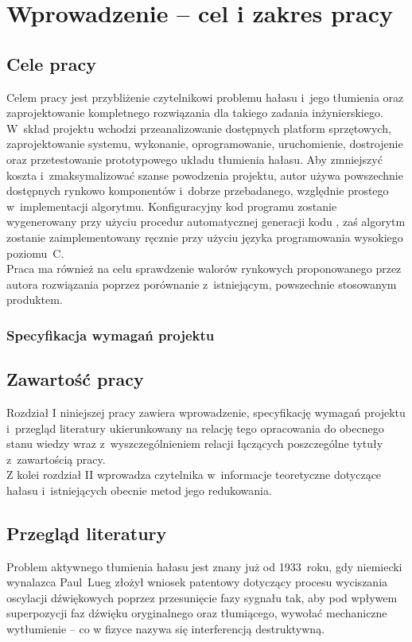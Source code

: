 \chapter{Wprowadzenie -- cel i zakres pracy}
\label{cha:intro}

\section{Cele pracy}
\label{sec:celePracy}
Celem pracy jest przybliżenie czytelnikowi problemu hałasu i~jego tłumienia oraz  zaprojektowanie kompletnego rozwiązania dla takiego zadania inżynierskiego. W~skład projektu wchodzi przeanalizowanie dostępnych platform sprzętowych, zaprojektowanie systemu, wykonanie, oprogramowanie, uruchomienie, dostrojenie oraz przetestowanie prototypowego układu tłumienia hałasu. Aby zmniejszyć koszta i~zmaksymalizować szanse powodzenia projektu, autor używa powszechnie dostępnych rynkowo komponentów i~dobrze przebadanego, względnie prostego w~implementacji algorytmu. Konfiguracyjny kod programu zostanie wygenerowany przy użyciu procedur automatycznej generacji kodu%
, zaś algorytm zostanie zaimplementowany ręcznie przy użyciu języka programowania wysokiego poziomu~C.\\
Praca ma również na celu sprawdzenie walorów rynkowych proponowanego przez autora rozwiązania poprzez porównanie z~istniejącym, powszechnie stosowanym produktem.
\subsection{Specyfikacja wymagań projektu}

\section{Zawartość pracy}
\label{sec:zawartoscPracy}
Rozdział I niniejszej pracy zawiera wprowadzenie, specyfikację wymagań projektu i~przegląd literatury ukierunkowany na relację tego opracowania do obecnego stanu wiedzy wraz z~wyszczególnieniem relacji łączących poszczególne tytuły z~zawartością pracy. \\
Z kolei rozdział II wprowadza czytelnika w~informacje teoretyczne dotyczące hałasu i~istniejących obecnie metod jego redukowania.
\section{Przegląd literatury}
Problem aktywnego tłumienia hałasu jest znany już od 1933~roku, gdy niemiecki wynalazca Paul~Lueg złożył wniosek patentowy\cite{LuegPatent} dotyczący procesu wyciszania oscylacji dźwiękowych poprzez przesunięcie fazy sygnału tak, aby pod wpływem superpozycji faz dźwięku oryginalnego oraz tłumiącego, wywołać mechaniczne wytłumienie -- co w fizyce nazywa się interferencją destruktywną.

